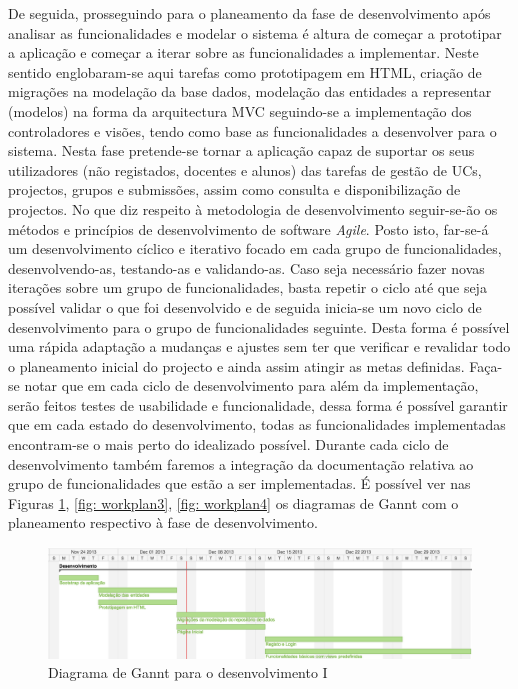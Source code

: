 De seguida, prosseguindo para o planeamento da fase de desenvolvimento após 
analisar as funcionalidades e modelar o sistema  é altura de começar a 
prototipar a aplicação e começar a iterar sobre as funcionalidades a 
implementar. Neste sentido englobaram-se aqui tarefas como prototipagem em HTML, 
criação de migrações na modelação da base dados, modelação das entidades a 
representar (modelos) na forma da arquitectura MVC seguindo-se a implementação dos 
controladores e visões, tendo como base as funcionalidades a desenvolver para o 
sistema. Nesta fase pretende-se tornar a aplicação capaz de suportar os seus 
utilizadores (não registados, docentes e alunos) das tarefas de gestão de UCs, 
projectos, grupos e submissões, assim como consulta e disponibilização de 
projectos. No que diz respeito à metodologia de desenvolvimento seguir-se-ão 
os métodos e princípios de desenvolvimento de software \textit{Agile}. Posto isto, 
far-se-á um desenvolvimento cíclico e iterativo focado em cada grupo de 
funcionalidades, desenvolvendo-as, testando-as e validando-as. Caso seja 
necessário fazer novas iterações sobre um grupo de funcionalidades, basta 
repetir o ciclo até que seja possível validar o que foi desenvolvido e de seguida inicia-se 
um novo ciclo de desenvolvimento para o grupo de funcionalidades seguinte.
Desta forma é possível uma rápida adaptação a mudanças e ajustes sem ter que verificar e 
revalidar todo o planeamento inicial do projecto e ainda assim atingir as metas 
definidas.
Faça-se notar que em cada ciclo de desenvolvimento para além da implementação,
 serão feitos testes de usabilidade e funcionalidade, dessa forma é possível garantir que em cada estado do 
desenvolvimento, todas as funcionalidades implementadas encontram-se o mais perto 
do idealizado possível.
Durante cada ciclo de desenvolvimento também faremos a integração da 
documentação relativa ao grupo de funcionalidades que estão a ser implementadas.
É possível ver nas Figuras \ref{fig: workplan2}, \ref{fig: workplan3}, \ref{fig: workplan4} 
os diagramas de Gannt com o planeamento respectivo à fase de desenvolvimento.

\begin{figure}[htbp!] 
	\centering
	\includegraphics[width=1\textwidth]{images/plano_de_trabalho/gannt_2.png}
 	\caption{Diagrama de Gannt para o desenvolvimento I}
 	\label{fig: workplan2}
\end{figure}

